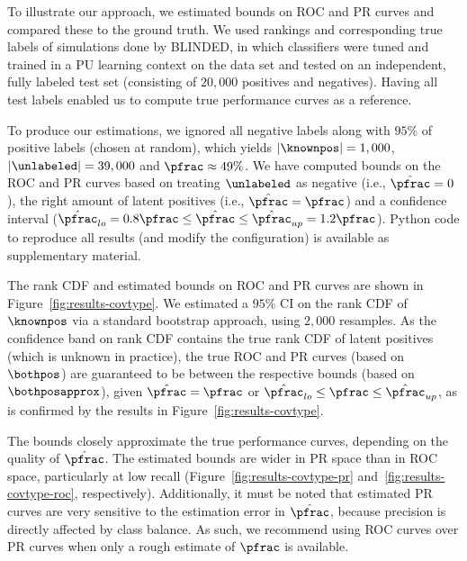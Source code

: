 To illustrate our approach, we estimated bounds on ROC and PR curves and compared these to the ground truth. We used rankings and corresponding true labels of simulations done by BLINDED, in which classifiers were tuned and trained in a PU learning context on the \covtype data set \citep{Blackard00covtype} and tested on an independent, fully labeled test set (consisting of $20,000$ positives and negatives). Having all test labels enabled us to compute true performance curves as a reference. 

To produce our estimations, we ignored all negative labels along with $95\%$ of positive labels (chosen at random), which yields $|\knownpos|=1,000$, $|\unlabeled| = 39,000$ and $\pfrac\approx49\%$. We have computed bounds on the ROC and PR curves based on treating $\unlabeled$ as negative (i.e., $\hat{\pfrac}=0$), the right amount of latent positives (i.e., $\hat{\pfrac}=\pfrac$) and a confidence interval ($\hat{\pfrac}_{lo} = 0.8\pfrac \leq \hat{\pfrac} \leq \hat{\pfrac}_{up} = 1.2\pfrac$). Python code to reproduce all results (and modify the configuration) is available as supplementary material.

The rank CDF and estimated bounds on ROC and PR curves are shown in Figure~\ref{fig:results-covtype}. We estimated a $95\%$ CI on the rank CDF of $\knownpos$ via a standard bootstrap approach, using $2,000$ resamples. As the confidence band on rank CDF contains the true rank CDF of latent positives (which is unknown in practice), the true ROC and PR curves (based on $\bothpos$) are guaranteed to be between the respective bounds (based on $\bothposapprox$), given $\hat{\pfrac}=\pfrac$ or $\hat{\pfrac}_{lo} \leq \pfrac \leq \hat{\pfrac}_{up}$, as is confirmed by the results in Figure~\ref{fig:results-covtype}.

The bounds closely approximate the true performance curves, depending on the quality of $\hat{\pfrac}$. The estimated bounds are wider in PR space than in ROC space, particularly at low recall (Figure~\ref{fig:results-covtype-pr} and~\ref{fig:results-covtype-roc}, respectively). Additionally, it must be noted that estimated PR curves are very sensitive to the estimation error in $\hat{\pfrac}$, because precision is directly affected by class balance. As such, we recommend using ROC curves over PR curves when only a rough estimate of $\pfrac$ is available.



